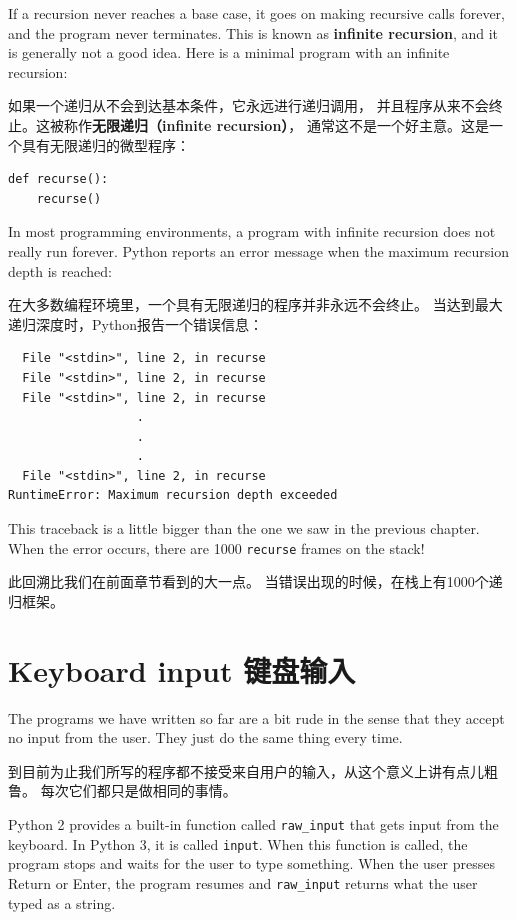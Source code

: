 \documentclass[10pt]{book}
\begin{document}
\begin{CJK}{UTF8}{gbsn}
If a recursion never reaches a base case, it goes on making
recursive calls forever, and the program never terminates.  This is
known as {\bf infinite recursion}, and it is generally not
a good idea.  Here is a minimal program with an infinite recursion:

如果一个递归从不会到达基本条件，它永远进行递归调用，
并且程序从来不会终止。这被称作{\bf 无限递归（infinite recursion）}，
通常这不是一个好主意。这是一个具有无限递归的微型程序：

\begin{verbatim}
def recurse():
    recurse()
\end{verbatim}
%
In most programming environments, a program with infinite recursion
does not really run forever.  Python reports an error
message when the maximum recursion depth is reached:

在大多数编程环境里，一个具有无限递归的程序并非永远不会终止。
当达到最大递归深度时，Python报告一个错误信息：

\begin{verbatim}
  File "<stdin>", line 2, in recurse
  File "<stdin>", line 2, in recurse
  File "<stdin>", line 2, in recurse
                  .   
                  .
                  .
  File "<stdin>", line 2, in recurse
RuntimeError: Maximum recursion depth exceeded
\end{verbatim}
%
This traceback is a little bigger than the one we saw in the
previous chapter.  When the error occurs, there are 1000
{\tt recurse} frames on the stack!

此回溯比我们在前面章节看到的大一点。
当错误出现的时候，在栈上有1000个递归框架。

\section{Keyboard input 键盘输入}

The programs we have written so far are a bit rude in the sense that
they accept no input from the user.  They just do the same thing every
time.

到目前为止我们所写的程序都不接受来自用户的输入，从这个意义上讲有点儿粗鲁。
每次它们都只是做相同的事情。

Python 2 provides a built-in function called \verb"raw_input" that gets
input from the keyboard.  In Python 3, it is called
  {\tt input}.  When this function is called, the program stops and
waits for the user to type something.  When the user presses {\sf
  Return} or {\sf Enter}, the program resumes and \verb"raw_input"
returns what the user typed as a string.


\end{CJK}
\end{document}

